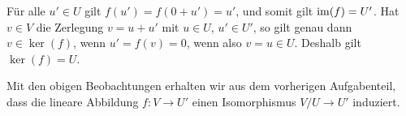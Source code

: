 Für alle $u' \in U$ gilt $f(u') = f(0 + u') = u'$, und somit gilt $\operatorname{im}(f) = U'$.
Hat $v \in V$ die Zerlegung $v = u + u'$ mit $u \in U$, $u' \in U'$, so gilt genau dann $v \in \ker(f)$, wenn $u' = f(v) = 0$, wenn also $v = u \in U$.
Deshalb gilt $\ker(f) = U$.

Mit den obigen Beobachtungen erhalten wir aus dem vorherigen Aufgabenteil, dass die lineare Abbildung $f \colon V \to U'$ einen Isomorphismus $V\!/U \to U'$ induziert.










